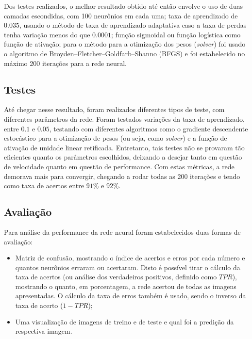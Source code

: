 \documentclass{article}
\begin{document}
        Dos testes realizados, o melhor resultado obtido até então envolve o
        uso de duas camadas escondidas, com 100 neurônios em cada uma; taxa de
        aprendizado de $0.035$, usando o método de taxa de aprendizado
        adaptativa caso a taxa de perdas tenha variação menos do que $0.0001$;
        função sigmoidal ou função logística como função de ativação; para o
        método para a otimização dos pesos (\textit{solver}) foi usado o
        algoritmo de Broyden–Fletcher–Goldfarb–Shanno (BFGS) e foi estabelecido
        no máximo 200 iterações para a rede neural. 
        
        \subsection*{Testes}    
            Até chegar nesse resultado, foram realizados diferentes tipos de
            teste, com diferentes parâmetros da rede. Foram testados variações
            da taxa de aprendizado, entre $0.1$ e $0.05$, testando com
            diferentes algoritmos como o gradiente descendente estocástico para
            a otimização de pesos (ou seja, como \textit{solver}) e a função de
            ativação de unidade linear retificada. Entretanto, tais testes não
            se provaram tão eficientes quanto os parâmetros escolhidos,
            deixando a desejar tanto em questão de velocidade quanto em questão
            de performance. Com estas métricas, a rede demorava mais para
            convergir, chegando a rodar todas as 200 iterações e tendo como
            taxa de acertos entre $91\%$ e $92\%$.
        
        \subsection*{Avaliação}
            Para análise da performance da rede neural foram estabelecidos duas
            formas de avaliação:
            \begin{itemize}
                \item Matriz de confusão, mostrando o índice de acertos e erros
                    por cada número e quantos neurônios erraram ou acertaram.
                    Disto é possível tirar o cálculo da taxa de acertos (ou
                    análise dos verdadeiros positivos, definido como $TPR$),
                    mostrando o quanto, em porcentagem, a rede acertou de todas
                    as imagens apresentadas. O cálculo da taxa de erros também
                    é usado, sendo o inverso da taxa de acerto ($1 - TPR$);
                \item Uma visualização de imagens de treino e de teste e qual
                    foi a predição da respectiva imagem.
            \end{itemize}
            
\end{document}

